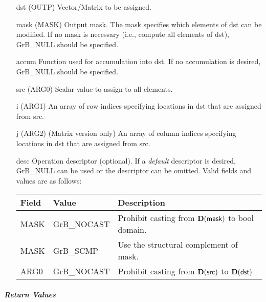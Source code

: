 \begin{itemize}[leftmargin=1.1in]
    \item[{\sf dst}]   ({\sf OUTP}) Vector/Matrix to be assigned.

    \item[{\sf mask}] ({\sf MASK}) Output mask. The mask specifies which elements
    of {\sf dst} can be modified. If no mask is necessary (i.e., compute all
    elements of {\sf dst}), {\sf GrB\_NULL} should be specified.

    \item[{\sf accum}] Function used for accumulation into {\sf dst}.  If no accumulation
                        is desired, {\sf GrB\_NULL} should be specified.

    \item[{\sf src}]   ({\sf ARG0}) Scalar value to assign to all elements.
    \item[{\sf i}]     ({\sf ARG1}) An array of row indices specifying locations in dst that
                       are assigned from src.
    \item[{\sf j}]     ({\sf ARG2}) (Matrix version only) An array of column indices 
                       specifying locations in dst that are assigned from src.


    \item[{\sf desc}]   Operation descriptor (optional). If a
    \emph{default} descriptor is desired, {\sf GrB\_NULL} can be
    used or the descriptor can be omitted.  Valid fields and values are as follows: \\
    \begin{tabular}{lll}
    Field  & Value & Description \\
    \hline
    {\sf MASK} & {\sf GrB\_NOCAST} & Prohibit casting from $\bold{D}({\sf mask})$ to {\sf bool} domain. \\
    {\sf MASK} & {\sf GrB\_SCMP} & Use the structural complement of {\sf mask}. \\
    {\sf ARG0} & {\sf GrB\_NOCAST} & Prohibit casting from $\bold{D}({\sf src})$ to $\bold{D}({\sf dst})$ \\
    \end{tabular}

\end{itemize}

\subparagraph{Return Values}

